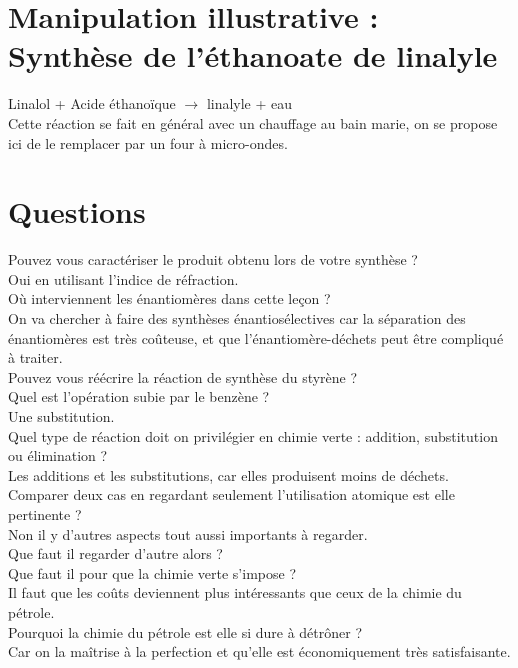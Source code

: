 \documentclass[12pt,prb,aps,epsf]{article}
\begin{document}
\section{Manipulation illustrative : Synthèse de  l'éthanoate de linalyle}

Linalol + Acide éthanoïque  $\longrightarrow$ linalyle + eau\\
Cette réaction se fait en général avec un chauffage au bain marie, on se propose ici de le remplacer par un four à micro-ondes.

\section*{Questions}
Pouvez vous caractériser le produit obtenu lors de votre synthèse ?\\
Oui en utilisant l'indice de réfraction.\\

Où interviennent les énantiomères dans cette leçon ?\\
On va chercher à faire des synthèses énantiosélectives car la séparation des énantiomères est très coûteuse, et que l'énantiomère-déchets peut être compliqué à traiter.\\

Pouvez vous réécrire la réaction de synthèse du styrène ?\\

Quel est l'opération subie par le benzène ?\\
Une substitution.\\

Quel type de réaction doit on privilégier en chimie verte : addition, substitution ou élimination ?\\
Les additions et les substitutions, car elles produisent moins de déchets.\\

Comparer deux cas en regardant seulement l'utilisation atomique est elle pertinente ?\\
Non il y d'autres aspects tout aussi importants à regarder.\\

Que faut il regarder d'autre alors ?\\

Que faut il pour que la chimie verte s'impose ?\\
Il faut que les coûts deviennent plus intéressants que ceux de la chimie du pétrole.\\

Pourquoi la chimie du pétrole est elle si dure à détrôner ?\\
Car on la maîtrise à la perfection et qu'elle est économiquement très satisfaisante.\\
\end{document}

